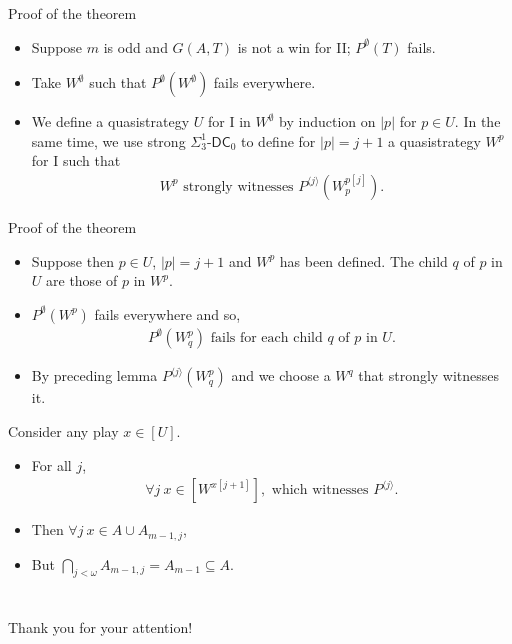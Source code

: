 \documentclass{beamer} %
\begin{document}

\begin{frame}{Proof of the theorem}
    \begin{itemize}
        \item<1-> Suppose $m$ is odd and $G(A,T)$ is not a win for II\@; $P^{\emptyset}(T)$ fails.
        \item<2-> Take $W^{\emptyset}$ such that $P^{\emptyset}(W^{\emptyset})$ fails everywhere.
        \item<3-> We define a quasistrategy $U$ for I in $W^{\emptyset}$ by induction on $|p|$ for $p \in U$.
        In the same time, we use strong $\Sigma^1_3$-$\mathsf{DC}_0$ to define for $|p| = j+1$ a quasistrategy $W^p$ 
        for I such that \begin{align*}
            W^p \text{ strongly witnesses } P^{\langle j \rangle}(W^{p[j] }_p).
        \end{align*}
    \end{itemize}
\end{frame}


\begin{frame}{Proof of the theorem}
    \begin{itemize}
        \item<1-> Suppose then $p \in U$, $|p| = j+1$ and 
        $W^{p}$ has been defined. The child $q$ of $p$ in $U$ are those of $p$ in $W^p$.
        \item<2-> $P^{\emptyset}(W^p)$ fails everywhere and so, 
        \begin{align*} 
            P^{\emptyset}(W^p_q) \text{  fails for each child $q$ of $p$ in $U$.} 
        \end{align*}
        \item<3-> By preceding lemma $P^{\langle j \rangle}(W^p_q)$ and we choose a $W^q$ 
        that strongly witnesses it.
    \end{itemize}
\end{frame}

\begin{frame}
    Consider any play $x \in [U]$.
    \begin{itemize}
        \item<2->  For all $j$, \begin{align*}
            \forall j \ x \in [W^{x[j+1]}], \text{ which witnesses } P^{\langle j \rangle}.
        \end{align*}
        \item<3-> Then $\forall j \ x \in A \cup A_{m-1, j}$,
        \item<4-> But $\bigcap_{j < \omega} A_{m-1, j} = A_{m-1} \subseteq A$.
    \end{itemize}    
\end{frame}
    


\section*{}
\begin{frame}
    \huge{Thank you for your attention!}
\end{frame}
\end{document}

